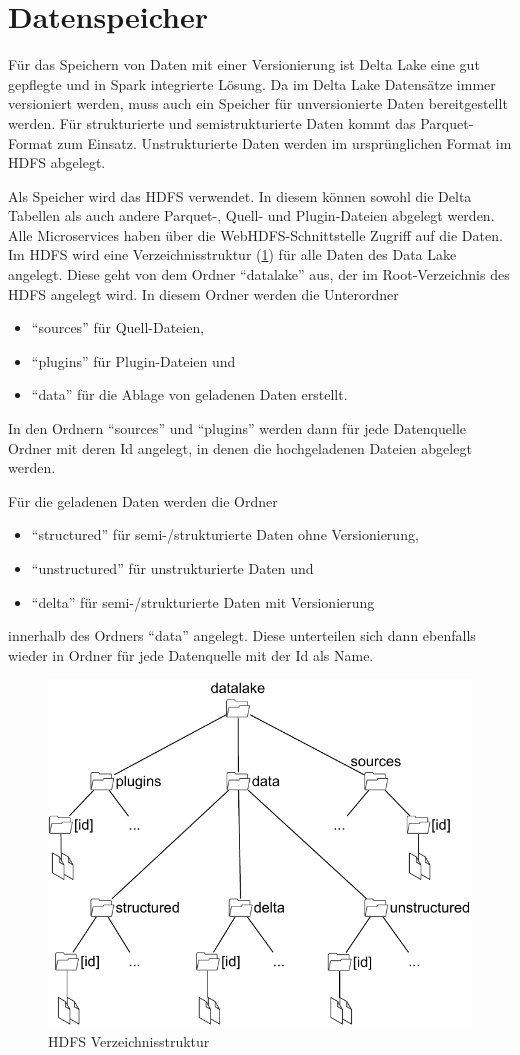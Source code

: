 \section{Datenspeicher}

Für das Speichern von Daten mit einer Versionierung ist Delta Lake eine gut gepflegte und in Spark integrierte Lösung.
Da im Delta Lake Datensätze immer versioniert werden, muss auch ein Speicher für unversionierte Daten bereitgestellt werden.
Für strukturierte und semistrukturierte Daten kommt das Parquet-Format zum Einsatz.
Unstrukturierte Daten werden im ursprünglichen Format im HDFS abgelegt.

Als Speicher wird das HDFS verwendet.
In diesem können sowohl die Delta Tabellen als auch andere Parquet-, Quell- und Plugin-Dateien abgelegt werden.
Alle Microservices haben über die WebHDFS-Schnittstelle Zugriff auf die Daten.
Im HDFS wird eine Verzeichnisstruktur (\cref{fig:hdfs-folder}) für alle Daten des Data Lake angelegt.
Diese geht von dem Ordner "`datalake"' aus, der im Root-Verzeichnis des HDFS angelegt wird.
In diesem Ordner werden die Unterordner
\begin{itemize}
    \item "`sources"' für Quell-Dateien,
    \item "`plugins"' für Plugin-Dateien und
    \item "`data"' für die Ablage von geladenen Daten erstellt.
\end{itemize}

In den Ordnern "`sources"' und "`plugins"' werden dann für jede Datenquelle Ordner mit deren Id angelegt, in denen die hochgeladenen Dateien abgelegt werden.

Für die geladenen Daten werden die Ordner \begin{itemize}
    \item "`structured"' für semi-/strukturierte Daten ohne Versionierung,
    \item "`unstructured"' für unstrukturierte Daten und
    \item "`delta"' für semi-/strukturierte Daten mit Versionierung
\end{itemize}
innerhalb des Ordners "`data"' angelegt.
Diese unterteilen sich dann ebenfalls wieder in Ordner für jede Datenquelle mit der Id als Name.

\begin{figure}
    \centering
    \includegraphics[width=.6\textwidth]{Grafiken/Umsetzung-Verzeichnisse.pdf}
    \caption{HDFS Verzeichnisstruktur}
    \label{fig:hdfs-folder}
\end{figure}